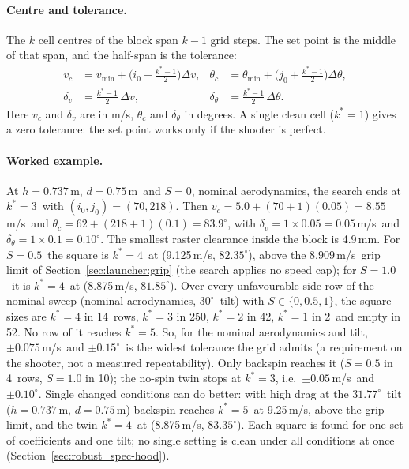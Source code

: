 \paragraph{Centre and tolerance.}
The $k$ cell centres of the block span $k-1$ grid steps.
The set point is the middle of that span, and the half-span is the tolerance:
\begin{align}
  v_c &= v_{\min} + \Big(i_0+\frac{k^\ast-1}{2}\Big)\Delta v, &
  \theta_c &= \theta_{\min} + \Big(j_0+\frac{k^\ast-1}{2}\Big)\Delta\theta,
  \label{eq:robust_spec-centre}\\
  \delta_v &= \frac{k^\ast-1}{2}\,\Delta v, &
  \delta_\theta &= \frac{k^\ast-1}{2}\,\Delta\theta .
  \label{eq:robust_spec-tol}
\end{align}
Here $v_c$ and $\delta_v$ are in \unit{m/s}, $\theta_c$ and $\delta_\theta$ in degrees.
A single clean cell ($k^\ast=1$) gives a zero tolerance: the set point works only if the shooter is
perfect.

\paragraph{Worked example.}
At $h=0.737$\,\unit{m}\assumed, $d=0.75$\,\unit{m}\assumed\ and $S=0$\assumed, nominal aerodynamics,
the search ends at $k^\ast=3$\predicted\ with $(i_0,j_0)=(70,218)$\predicted.
Then
$v_c = 5.0 + (70+1)(0.05) = 8.55$\,\unit{m/s}\predicted\ and
$\theta_c = 62 + (218+1)(0.1) = 83.9^\circ$\predicted, with
$\delta_v = 1\times0.05 = 0.05$\,\unit{m/s}\derived\ and
$\delta_\theta = 1\times0.1 = 0.10^\circ$\derived.
The smallest raster clearance inside the block is 4.9\,\unit{mm}\predicted.
For $S=0.5$\assumed\ the square is $k^\ast=4$\predicted\ at (9.125\,\unit{m/s}\predicted,
$82.35^\circ$\predicted), above the $8.909$\,\unit{m/s}\predicted\ grip limit of
Section~\ref{sec:launcher:grip} (the search applies no speed cap); for $S=1.0$\assumed\ it is
$k^\ast=4$\predicted\ at (8.875\,\unit{m/s}\predicted, $81.85^\circ$\predicted).
Over every unfavourable-side row of the nominal sweep (nominal aerodynamics, $30^\circ$\confirmed\ tilt)
with $S\in\{0,0.5,1\}$, the square sizes are
$k^\ast=4$ in 14\predicted\ rows, $k^\ast=3$ in 250\predicted, $k^\ast=2$ in 42\predicted,
$k^\ast=1$ in 2\predicted\ and empty in 52\predicted.
No row of it reaches $k^\ast=5$.
So, for the nominal aerodynamics and tilt, $\pm0.075$\,\unit{m/s}\predicted\ and $\pm0.15^\circ$\predicted\
is the widest tolerance the grid admits (a requirement on the shooter, not a measured repeatability).
Only backspin reaches it ($S=0.5$ in 4\predicted\ rows, $S=1.0$ in 10\predicted); the no-spin twin stops
at $k^\ast=3$\predicted, i.e.\ $\pm0.05$\,\unit{m/s}\predicted\ and $\pm0.10^\circ$\predicted.
Single changed conditions can do better: with high drag at the $31.77^\circ$\derived\ tilt
($h=0.737$\,\unit{m}\assumed, $d=0.75$\,\unit{m}\assumed) backspin reaches $k^\ast=5$\predicted\ at
9.25\,\unit{m/s}\predicted, above the grip limit, and the twin $k^\ast=4$\predicted\ at
(8.875\,\unit{m/s}\predicted, $83.35^\circ$\predicted).
Each square is found for one set of coefficients and one tilt; no single setting is clean under
all conditions at once (Section~\ref{sec:robust_spec-hood}).

